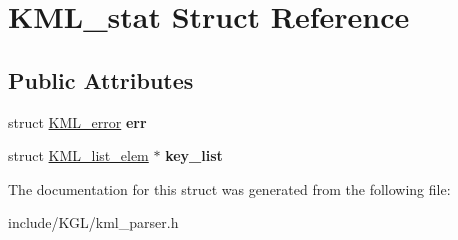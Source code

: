 \hypertarget{struct_k_m_l__stat}{}\section{K\+M\+L\+\_\+stat Struct Reference}
\label{struct_k_m_l__stat}
\subsection*{Public Attributes}
\begin{DoxyCompactItemize}
\item 
\mbox{\label{struct_k_m_l__stat_a6fe16e9fbe38c313591e5484716c68f4}} 
struct \mbox{\hyperlink{struct_k_m_l__error}{K\+M\+L\+\_\+error}} {\bfseries err}
\item 
\mbox{\label{struct_k_m_l__stat_a4ca16b69ad4732619d2131dcd28a2384}} 
struct \mbox{\hyperlink{struct_k_m_l__list__elem}{K\+M\+L\+\_\+list\+\_\+elem}} $\ast$ {\bfseries key\+\_\+list}
\end{DoxyCompactItemize}


The documentation for this struct was generated from the following file\+:\begin{DoxyCompactItemize}
\item 
include/\+K\+G\+L/kml\+\_\+parser.\+h\end{DoxyCompactItemize}

